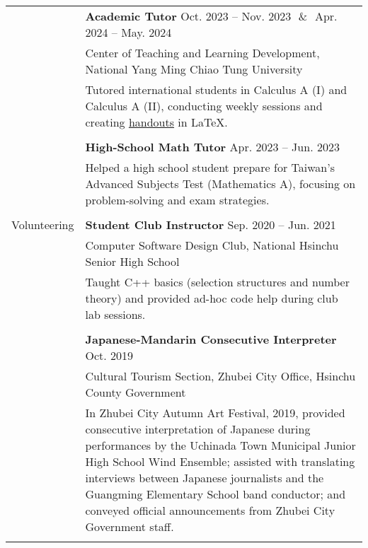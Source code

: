 \documentclass[letterpaper, 11pt]{article}
\begin{document}
\begin{center}
\begin{longtable}{p{0.81in}p{5.88in}}
        & \textbf{Academic Tutor} \hfill Oct. 2023 -- Nov. 2023\ \,\&\ \,Apr. 2024 -- May. 2024\\
        & Center of Teaching and Learning Development, National Yang Ming Chiao Tung University\\
        & Tutored international students in Calculus A (I) and Calculus A (II), conducting weekly sessions and creating \href{https://github.com/eiken59/2024_II_Tutor}{handouts} in \LaTeX.\\
        & \\

        & \textbf{High-School Math Tutor} \hfill Apr. 2023 -- Jun. 2023 \\
        & Helped a high school student prepare for Taiwan's Advanced Subjects Test (Mathematics A), focusing on problem-solving and exam strategies.\\
        & \\


        {\textcolor{OliveGreen}{Volunteering}} & \textbf{Student Club Instructor} \hfill Sep. 2020 -- Jun. 2021 \\
        & Computer Software Design Club, National Hsinchu Senior High School \\
        & Taught C++ basics (selection structures and number theory) and provided ad-hoc code help during club lab sessions. \\
        & \\

        & \textbf{Japanese-Mandarin Consecutive Interpreter} \hfill Oct. 2019 \\
        & Cultural Tourism Section, Zhubei City Office, Hsinchu County Government\\ 
        & In Zhubei City Autumn Art Festival, 2019, provided consecutive interpretation of Japanese during performances by the Uchinada Town Municipal Junior High School Wind Ensemble; assisted with translating interviews between Japanese journalists and the Guangming Elementary School band conductor; and conveyed official announcements from Zhubei City Government staff. \\
        & \\
        
        
    \end{longtable}
\end{center}
\end{document}
